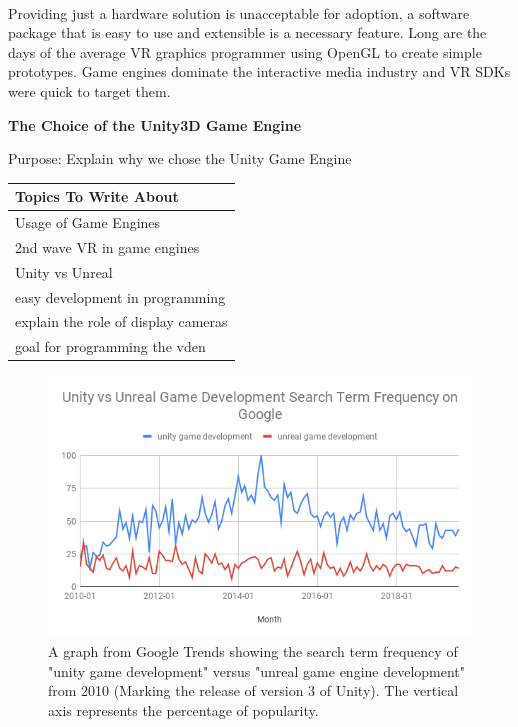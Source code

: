 \label{chapter:softwareChapter}

\label{sec:swIntroductionSection}\\

Providing just a hardware solution is unacceptable for adoption, a software package that is easy to use and extensible is a necessary feature. Long are the days of the average VR graphics programmer using OpenGL to create simple prototypes. Game engines dominate the interactive media industry and VR SDKs were quick to target them.

\noindent\textbf{The Choice of the Unity3D Game Engine}
\begin{center}
	\textcolor{OliveGreen}{Purpose: Explain why we chose the Unity Game Engine}
	
	\begin{table}[H]
		\centering
		\renewcommand\arraystretch{0.5}
		\begin{tabular}{|l|}
			\hline 
			Topics To Write About \\ 
			\hline 
			Usage of Game Engines \\
			2nd wave VR in game engines  \\
			Unity vs Unreal \\  
			easy development in programming \\ 
			explain the role of display cameras \\ 
			goal for programming the vden  \\
			\hline 
		\end{tabular}
	\end{table}
\end{center}


\begin{figure}[H]
	\centering
	\includegraphics[width=6in]{images/googletrends-unity-game-dev-vs-unreal}
	\caption[Unity vs Unreal Search Term Frequency]{A graph from Google Trends showing the search term frequency of "unity game development" versus "unreal game engine development" from 2010 (Marking the release of version 3 of Unity). The vertical axis represents the percentage of popularity.}
	\label{fig:googletrends-unity-game-dev-vs-unreal}
\end{figure}


